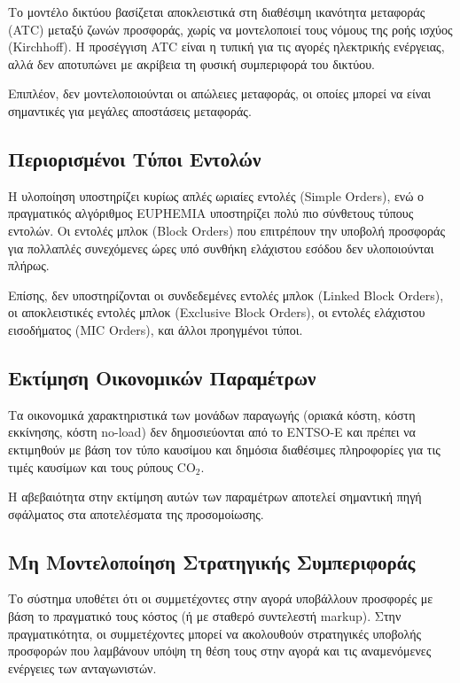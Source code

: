 Το μοντέλο δικτύου βασίζεται αποκλειστικά στη διαθέσιμη ικανότητα μεταφοράς (ATC) μεταξύ ζωνών προσφοράς, χωρίς να μοντελοποιεί τους νόμους της ροής ισχύος (Kirchhoff). Η προσέγγιση ATC είναι η τυπική για τις αγορές ηλεκτρικής ενέργειας, αλλά δεν αποτυπώνει με ακρίβεια τη φυσική συμπεριφορά του δικτύου.

Επιπλέον, δεν μοντελοποιούνται οι απώλειες μεταφοράς, οι οποίες μπορεί να είναι σημαντικές για μεγάλες αποστάσεις μεταφοράς.

\subsection{Περιορισμένοι Τύποι Εντολών}
\label{subsec:order-types-limitation}

Η υλοποίηση υποστηρίζει κυρίως απλές ωριαίες εντολές (Simple Orders), ενώ ο πραγματικός αλγόριθμος EUPHEMIA υποστηρίζει πολύ πιο σύνθετους τύπους εντολών. Οι εντολές μπλοκ (Block Orders) που επιτρέπουν την υποβολή προσφοράς για πολλαπλές συνεχόμενες ώρες υπό συνθήκη ελάχιστου εσόδου δεν υλοποιούνται πλήρως.

Επίσης, δεν υποστηρίζονται οι συνδεδεμένες εντολές μπλοκ (Linked Block Orders), οι αποκλειστικές εντολές μπλοκ (Exclusive Block Orders), οι εντολές ελάχιστου εισοδήματος (MIC Orders), και άλλοι προηγμένοι τύποι.

\subsection{Εκτίμηση Οικονομικών Παραμέτρων}
\label{subsec:economic-parameters-limitation}

Τα οικονομικά χαρακτηριστικά των μονάδων παραγωγής (οριακά κόστη, κόστη εκκίνησης, κόστη no-load) δεν δημοσιεύονται από το ENTSO-E και πρέπει να εκτιμηθούν με βάση τον τύπο καυσίμου και δημόσια διαθέσιμες πληροφορίες για τις τιμές καυσίμων και τους ρύπους CO$_2$.

Η αβεβαιότητα στην εκτίμηση αυτών των παραμέτρων αποτελεί σημαντική πηγή σφάλματος στα αποτελέσματα της προσομοίωσης.

\subsection{Μη Μοντελοποίηση Στρατηγικής Συμπεριφοράς}
\label{subsec:strategic-behavior-limitation}

Το σύστημα υποθέτει ότι οι συμμετέχοντες στην αγορά υποβάλλουν προσφορές με βάση το πραγματικό τους κόστος (ή με σταθερό συντελεστή markup). Στην πραγματικότητα, οι συμμετέχοντες μπορεί να ακολουθούν στρατηγικές υποβολής προσφορών που λαμβάνουν υπόψη τη θέση τους στην αγορά και τις αναμενόμενες ενέργειες των ανταγωνιστών.

